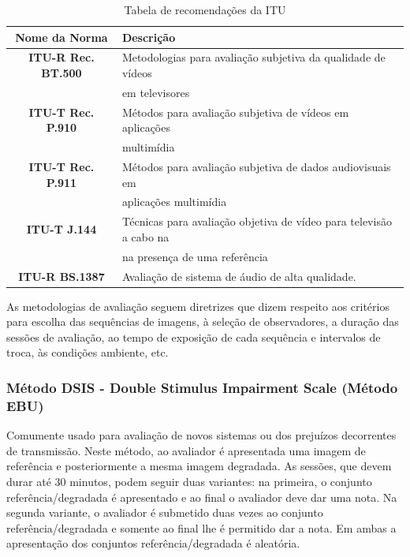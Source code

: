 \begin{table}
	\centering
	\caption{Tabela de recomendações da ITU}
	\label{tab:recomendacoes}
	\begin{tabular}{c|l}
		\hline
		\textbf{Nome da Norma} & Descrição \\
		\hline
		\textbf{ITU-R Rec. BT.500} & Metodologias para avaliação subjetiva da qualidade de vídeos \\
			& em televisores \\
		\textbf{ITU-T Rec. P.910} & Métodos para avaliação subjetiva de vídeos em aplicações \\
			& multimídia \\
		\textbf{ITU-T Rec. P.911} & Métodos para avaliação subjetiva de dados audiovisuais em \\
			& aplicações multimídia \\
		\textbf{ITU-T J.144} & Técnicas para avaliação objetiva de vídeo para televisão a cabo na \\
			& na presença de uma referência \\
		\textbf{ITU-R BS.1387} & Avaliação de sistema de áudio de alta qualidade. \\
		\hline
	\end{tabular}
\end{table}

As metodologias de avaliação seguem diretrizes que dizem respeito aos critérios para escolha das sequências de imagens, à seleção de observadores, a duração das sessões de avaliação, ao tempo de exposição de cada sequência e intervalos de troca, às condições ambiente, etc.

\subsubsection{Método DSIS - Double Stimulus Impairment Scale (Método EBU)}

Comumente usado para avaliação de novos sistemas ou dos prejuízos decorrentes de transmissão. Neste método, ao avaliador é apresentada uma imagem de referência e posteriormente a mesma imagem degradada. As sessões, que devem durar até 30 minutos, podem seguir duas variantes: na primeira, o conjunto referência/degradada é apresentado e ao final o avaliador deve dar uma nota. Na segunda variante, o avaliador é submetido duas vezes ao conjunto referência/degradada e somente ao final lhe é permitido dar a nota. Em ambas a apresentação dos conjuntos referência/degradada é aleatória.

